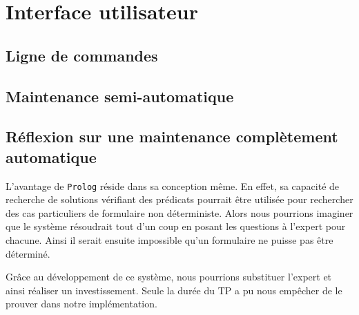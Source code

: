 
\chapter{Interface utilisateur}

\section{Ligne de commandes}

\section{Maintenance semi-automatique}

\section{Réflexion sur une maintenance complètement automatique}

L'avantage de \texttt{Prolog} réside dans sa conception même. En effet, sa capacité de recherche de solutions vérifiant des prédicats
pourrait être utilisée pour rechercher des cas particuliers de formulaire non déterministe. Alors nous pourrions imaginer que le
système résoudrait tout d'un coup en posant les questions à l'expert pour chacune. Ainsi il serait ensuite impossible qu'un
formulaire ne puisse pas être déterminé.

Grâce au développement de ce système, nous pourrions substituer l'expert et ainsi réaliser un investissement. Seule la durée du TP a pu nous empêcher de le prouver dans notre
implémentation.

